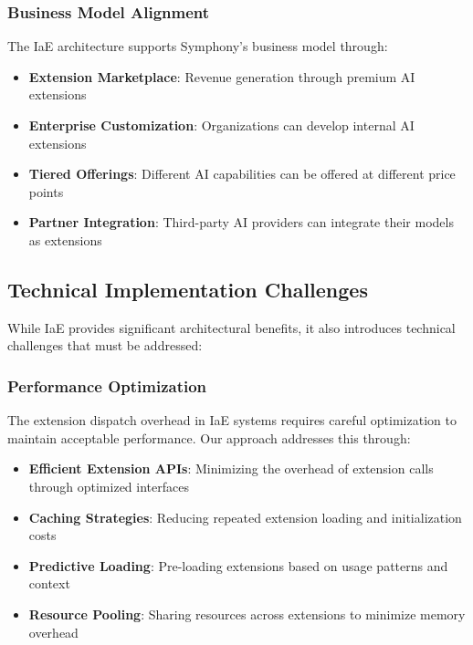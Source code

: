 \subsubsection{Business Model Alignment}

The IaE architecture supports Symphony's business model through:

\begin{itemize}
    \item \textbf{Extension Marketplace}: Revenue generation through premium AI extensions
    \item \textbf{Enterprise Customization}: Organizations can develop internal AI extensions
    \item \textbf{Tiered Offerings}: Different AI capabilities can be offered at different price points
    \item \textbf{Partner Integration}: Third-party AI providers can integrate their models as extensions
\end{itemize}

\subsection{Technical Implementation Challenges}

While IaE provides significant architectural benefits, it also introduces technical challenges that must be addressed:

\subsubsection{Performance Optimization}

The extension dispatch overhead in IaE systems requires careful optimization to maintain acceptable performance. Our approach addresses this through:

\begin{itemize}
    \item \textbf{Efficient Extension APIs}: Minimizing the overhead of extension calls through optimized interfaces
    \item \textbf{Caching Strategies}: Reducing repeated extension loading and initialization costs
    \item \textbf{Predictive Loading}: Pre-loading extensions based on usage patterns and context
    \item \textbf{Resource Pooling}: Sharing resources across extensions to minimize memory overhead
\end{itemize}


